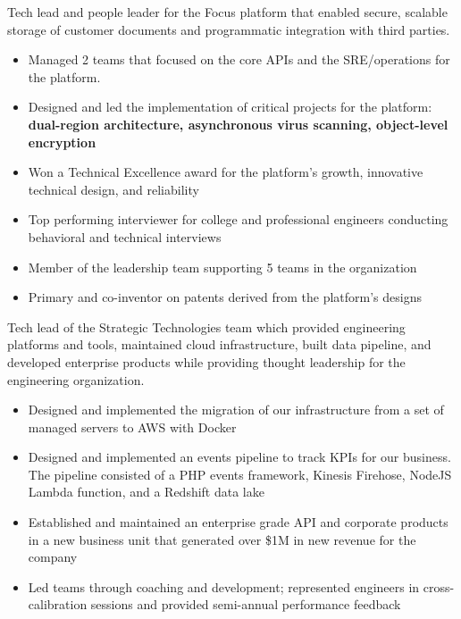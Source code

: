 \documentclass[10pt,a4paper,ragged2e,withhyper]{altacv}
\begin{document}
\begin{paracol}{2}
\divider{}

Tech lead and people leader for the Focus platform that enabled secure, scalable storage of customer documents and programmatic integration with third parties.
\begin{itemize}
\item Managed 2 teams that focused on the core APIs and the SRE/operations for the platform.
\item Designed and led the implementation of critical projects for the platform: \textbf{dual-region architecture, asynchronous virus scanning, object-level encryption}
\item Won a Technical Excellence award for the platform's growth, innovative technical design, and reliability
\item Top performing interviewer for college and professional engineers conducting behavioral and technical interviews
\item Member of the leadership team supporting 5 teams in the organization
\item Primary and co-inventor on patents derived from the platform's designs
\end{itemize}


\divider{}

Tech lead of the Strategic Technologies team which provided engineering platforms and tools, maintained cloud infrastructure, built data pipeline, and developed enterprise products while providing thought leadership for the engineering organization.
\begin{itemize}
\item Designed and implemented the migration of our infrastructure from a set of managed servers to AWS with Docker
\item Designed and implemented an events pipeline to track KPIs for our business. The pipeline consisted of a PHP events framework, Kinesis Firehose, NodeJS Lambda function, and a Redshift data lake
\item Established and maintained an enterprise grade API and corporate products in a new business unit that generated over \$1M in new revenue for the company
\item Led teams through coaching and development; represented engineers in cross-calibration sessions and provided semi-annual performance feedback
\end{itemize}


\end{paracol}
\end{document}
